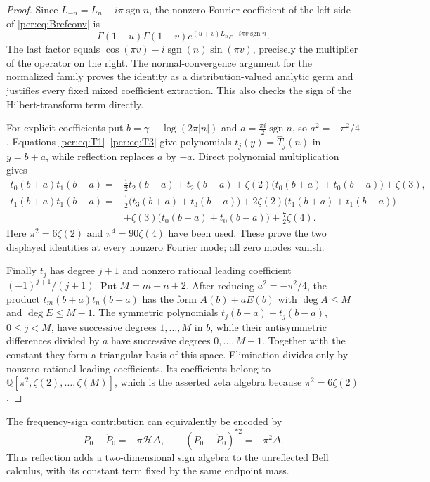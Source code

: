 \begin{proof}
Since $L_{-n}=L_n-i\pi\operatorname{sgn}n$, the nonzero Fourier
coefficient of the left side of \eqref{per:eq:Brefconv} is
\[
 \Gamma(1-u)\Gamma(1-v)
       e^{(u+v)L_n}e^{-i\pi v\operatorname{sgn}n}.
\]
The last factor equals
$\cos(\pi v)-i\operatorname{sgn}(n)\sin(\pi v)$, precisely the
multiplier of the operator on the right. The normal-convergence argument
for the normalized family proves the identity as a distribution-valued
analytic germ and justifies every fixed mixed coefficient extraction.
This also checks the sign of the Hilbert-transform term directly.

For explicit coefficients put $b=\gamma+\log(2\pi|n|)$ and
$a=\tfrac{\pi i}{2}\operatorname{sgn}n$, so $a^2=-\pi^2/4$.
Equations \eqref{per:eq:T1}--\eqref{per:eq:T3} give polynomials
$t_j(y)=\widehat T_j(n)$ in $y=b+a$, while reflection replaces $a$
by $-a$. Direct polynomial multiplication gives
\begin{align*}
 t_0(b+a)t_1(b-a)
 ={}&\tfrac12t_2(b+a)+t_2(b-a)
    +\zeta(2)\bigl(t_0(b+a)+t_0(b-a)\bigr)+\zeta(3),\\
 t_1(b+a)t_1(b-a)
 ={}&\tfrac12\bigl(t_3(b+a)+t_3(b-a)\bigr)
    +2\zeta(2)\bigl(t_1(b+a)+t_1(b-a)\bigr)\\
 &+\zeta(3)\bigl(t_0(b+a)+t_0(b-a)\bigr)+\tfrac72\zeta(4).
\end{align*}
Here $\pi^2=6\zeta(2)$ and $\pi^4=90\zeta(4)$ have been used.
These prove the two displayed identities at every nonzero Fourier mode;
all zero modes vanish.

Finally $t_j$ has degree $j+1$ and nonzero rational leading coefficient
$(-1)^{j+1}/(j+1)$. Put $M=m+n+2$. After reducing $a^2=-\pi^2/4$,
the product $t_m(b+a)t_n(b-a)$ has the form
$A(b)+aE(b)$ with $\deg A\le M$ and $\deg E\le M-1$.
The symmetric polynomials $t_j(b+a)+t_j(b-a)$, $0\le j<M$,
have successive degrees $1,\ldots,M$ in $b$, while their antisymmetric
differences divided by $a$ have successive degrees $0,\ldots,M-1$.
Together with the constant they form a triangular basis of this space.
Elimination divides only by nonzero rational leading coefficients.
Its coefficients belong to
$\mathbb Q[\pi^2,\zeta(2),\ldots,\zeta(M)]$, which is the asserted
zeta algebra because $\pi^2=6\zeta(2)$.
\end{proof}

The frequency-sign contribution can equivalently be encoded by
\[
 P_0-\check P_0=-\pi\mathcal H\Delta,\qquad
 (P_0-\check P_0)^{*2}=-\pi^2\Delta.
\]
Thus reflection adds a two-dimensional sign algebra to the unreflected
Bell calculus, with its constant term fixed by the same endpoint mass.

